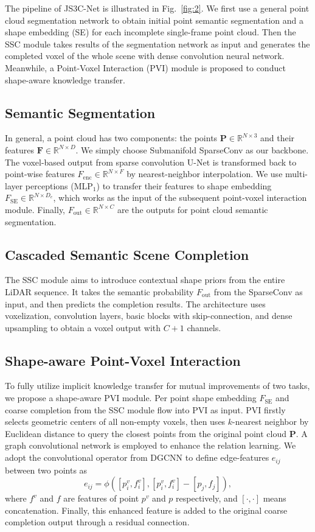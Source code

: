 \documentclass[11pt,twocolumn]{article}
\begin{document}
The pipeline of JS3C-Net is illustrated in Fig.~\ref{fig:2}. We first use a general point cloud segmentation network to obtain initial point semantic segmentation and a shape embedding (SE) for each incomplete single-frame point cloud. Then the SSC module takes results of the segmentation network as input and generates the completed voxel of the whole scene with dense convolution neural network. Meanwhile, a Point-Voxel Interaction (PVI) module is proposed to conduct shape-aware knowledge transfer.

\subsection{Semantic Segmentation}
In general, a point cloud has two components: the points $\mathbf{P} \in \mathbb{R}^{N \times 3}$ and their features $\mathbf{F} \in \mathbb{R}^{N \times D}$. We simply choose Submanifold SparseConv as our backbone. The voxel-based output from sparse convolution U-Net is transformed back to point-wise features $F_{\mathrm{enc}} \in \mathbb{R}^{N \times F}$ by nearest-neighbor interpolation. We use multi-layer perceptions (MLP$_1$) to transfer their features to shape embedding $F_{\mathrm{SE}} \in \mathbb{R}^{N \times D_e}$, which works as the input of the subsequent point-voxel interaction module. Finally, $F_{\mathrm{out}} \in \mathbb{R}^{N \times C}$ are the outputs for point cloud semantic segmentation.

\subsection{Cascaded Semantic Scene Completion}
The SSC module aims to introduce contextual shape priors from the entire LiDAR sequence. It takes the semantic probability $F_{\mathrm{out}}$ from the SparseConv as input, and then predicts the completion results. The architecture uses voxelization, convolution layers, basic blocks with skip-connection, and dense upsampling to obtain a voxel output with $C+1$ channels.

\subsection{Shape-aware Point-Voxel Interaction}
To fully utilize implicit knowledge transfer for mutual improvements of two tasks, we propose a shape-aware PVI module. Per point shape embedding $F_{\mathrm{SE}}$ and coarse completion from the SSC module flow into PVI as input. PVI firstly selects geometric centers of all non-empty voxels, then uses $k$-nearest neighbor by Euclidean distance to query the closest points from the original point cloud $\mathbf{P}$. A graph convolutional network is employed to enhance the relation learning. We adopt the convolutional operator from DGCNN to define edge-features $e_{ij}$ between two points as
\begin{equation}
e_{ij} = \phi([p^v_i, f^v_i], [p^v_i, f^v_i] - [p_j, f_j]),
\end{equation}
where $f^v$ and $f$ are features of point $p^v$ and $p$ respectively, and $[\cdot,\cdot]$ means concatenation. Finally, this enhanced feature is added to the original coarse completion output through a residual connection.
\end{document}
